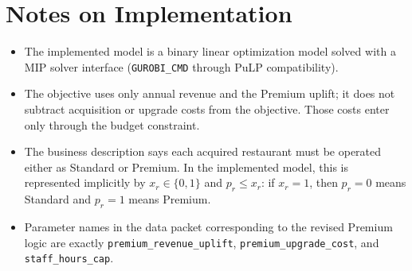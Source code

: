 \section*{Notes on Implementation}

\begin{itemize}
    \item The implemented model is a binary linear optimization model solved with a MIP solver interface (\texttt{GUROBI\_CMD} through PuLP compatibility).
    \item The objective uses only annual revenue and the Premium uplift; it does not subtract acquisition or upgrade costs from the objective. Those costs enter only through the budget constraint.
    \item The business description says each acquired restaurant must be operated either as Standard or Premium. In the implemented model, this is represented implicitly by $x_r \in \{0,1\}$ and $p_r \le x_r$: if $x_r=1$, then $p_r=0$ means Standard and $p_r=1$ means Premium.
    \item Parameter names in the data packet corresponding to the revised Premium logic are exactly \texttt{premium\_revenue\_uplift}, \texttt{premium\_upgrade\_cost}, and \texttt{staff\_hours\_cap}.
\end{itemize}
